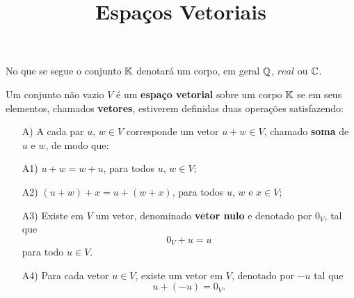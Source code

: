 \documentclass{beamer}
\title{Espaços Vetoriais}
\author[\autor]{\autor}
\institute[\instituto]{\instituto}
\date{}
\begin{document}
    \begin{frame}
        \maketitle
    \end{frame}


    \begin{frame}
        No que se segue o conjunto $\mathbb{K}$ denotar\'a um corpo, em geral $\mathbb{Q}$, $real$ ou $\mathbb{C}$.

        \vspace{.3cm}

        \begin{definicao}
    	    Um conjunto	n\~ao vazio $V$ \'e um \textbf{espa\c{c}o vetorial} sobre um corpo $\mathbb{K}$ se em seus elementos, chamados \textbf{vetores}, estiverem definidas duas opera\c{c}\~oes satisfazendo:
    	    \begin{itemize}
        		\item[A)] A cada par $u$, $w \in V$ corresponde um vetor $u + w \in V$, chamado \textbf{soma} de $u$ e $w$, de modo que:

                \vspace{.3cm}

		        \item[A1)] $u + w = w + u$, para todos $u$, $w \in V$;
	
                \vspace{.3cm}

        	    \item[A2)] $(u + w) + x = u + (w + x)$, para todos $u$, $w$ e $x \in V$;
	    	\end{itemize}
	    \end{definicao}
	\end{frame}

	\begin{frame}
	    \begin{definicao}
	        \begin{itemize}
        		\item[A3)] Existe em $V$ um vetor, denominado \textbf{vetor nulo} e denotado por $0_V$, tal que
	    	    \[
	        		0_V + u = u
    		    \]
    		    para todo $u \in V$.
	
                \vspace{.3cm}

             	\item[A4)] Para cada vetor $u \in V$, existe um vetor em $V$, denotado por $-u$ tal que
    	    	\[
		        	u + (-u) = 0_V.
    	    	\]
	    	\end{itemize}
	    \end{definicao}
	\end{frame}
\end{document}
